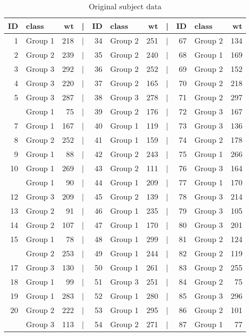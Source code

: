 \documentclass[smallextended]{svjour3}       %
\begin{document}
\begin{table}
\caption{\label{tab:subject-weights}Original subject data}
\centering
\begin{tabular}[t]{rlrlrlrlrlr}
\toprule
ID & class & wt & | & ID & class & wt & | & ID & class & wt\\
\midrule
1 & Group 1 & 218 & | & 34 & Group 2 & 251 & | & 67 & Group 2 & 134\\
2 & Group 2 & 239 & | & 35 & Group 2 & 240 & | & 68 & Group 1 & 169\\
3 & Group 3 & 292 & | & 36 & Group 2 & 252 & | & 69 & Group 2 & 152\\
4 & Group 3 & 220 & | & 37 & Group 2 & 165 & | & 70 & Group 2 & 218\\
5 & Group 3 & 287 & | & 38 & Group 3 & 278 & | & 71 & Group 2 & 297\\
\addlinespace
6 & Group 1 & 75 & | & 39 & Group 2 & 176 & | & 72 & Group 3 & 167\\
7 & Group 1 & 167 & | & 40 & Group 1 & 119 & | & 73 & Group 3 & 136\\
8 & Group 2 & 252 & | & 41 & Group 1 & 159 & | & 74 & Group 2 & 178\\
9 & Group 1 & 88 & | & 42 & Group 2 & 243 & | & 75 & Group 1 & 266\\
10 & Group 1 & 269 & | & 43 & Group 2 & 111 & | & 76 & Group 3 & 164\\
\addlinespace
11 & Group 1 & 90 & | & 44 & Group 1 & 209 & | & 77 & Group 1 & 170\\
12 & Group 3 & 209 & | & 45 & Group 2 & 139 & | & 78 & Group 3 & 214\\
13 & Group 2 & 91 & | & 46 & Group 1 & 235 & | & 79 & Group 3 & 105\\
14 & Group 2 & 107 & | & 47 & Group 1 & 170 & | & 80 & Group 3 & 201\\
15 & Group 1 & 78 & | & 48 & Group 1 & 299 & | & 81 & Group 2 & 124\\
\addlinespace
16 & Group 2 & 253 & | & 49 & Group 1 & 244 & | & 82 & Group 2 & 119\\
17 & Group 3 & 130 & | & 50 & Group 1 & 261 & | & 83 & Group 2 & 255\\
18 & Group 1 & 99 & | & 51 & Group 3 & 251 & | & 84 & Group 2 & 75\\
19 & Group 1 & 283 & | & 52 & Group 1 & 280 & | & 85 & Group 3 & 296\\
20 & Group 2 & 222 & | & 53 & Group 1 & 295 & | & 86 & Group 2 & 101\\
\addlinespace
21 & Group 3 & 113 & | & 54 & Group 2 & 271 & | & 87 & Group 1 & 77\\

\end{tabular}
\end{table}
\end{document}
